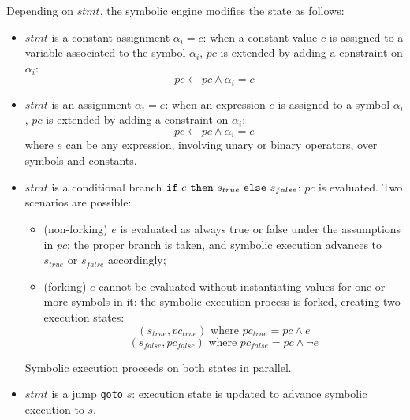 \noindent Depending on $stmt$, the symbolic engine modifies the state as follows:
\begin{itemize}
  \item $stmt$ is a constant assignment $\alpha_i = c$: when a constant value $c$ is assigned to a variable associated to the symbol $\alpha_i$, $pc$ is extended by adding a constraint on $\alpha_i$:
    \[ pc \gets pc \wedge \alpha_i = c\]

  \item $stmt$ is an assignment $\alpha_i = e$: when an expression $e$ is assigned to a symbol $\alpha_i$, $pc$ is extended by adding a constraint on $\alpha_i$:
    \[ pc \gets pc \wedge \alpha_i = e\]
  where $e$ can be any expression, involving unary or binary operators, over symbols and constants.

  \item $stmt $ is a conditional branch ${\tt if}~e~{\tt then}~s_{true}~{\tt else}~s_{false}$: $pc$ is evaluated. Two scenarios are possible:
    \begin{itemize}
      \item (non-forking) $e$ is evaluated as always true or false under the assumptions in $pc$: the proper branch is taken, and symbolic execution advances to $s_{true}$ or $s_{false}$ accordingly;
      \item (forking) $e$ cannot be evaluated without instantiating values for one or more symbols in it: the symbolic execution process is forked, creating two execution states:
        \[ (s_{true}, pc_{true}) \text{ where } pc_{true} = pc \wedge e \]
        \[ (s_{false}, pc_{false}) \text{ where } pc_{false} = pc \wedge \neg e \]
    \end{itemize}
    Symbolic execution proceeds on both states in parallel.

  \item $stmt $ is a jump {\tt goto} $s$: execution state is updated to advance symbolic execution to $s$. 
\end{itemize}



